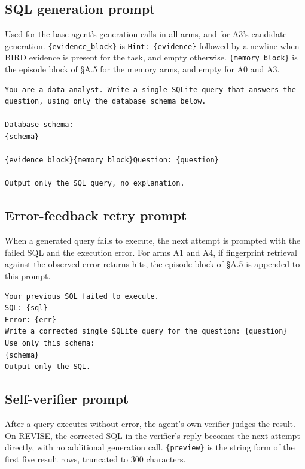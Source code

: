 \documentclass[sigconf, nonacm]{acmart}
\begin{document}
\subsection{SQL generation prompt}

Used for the base agent's generation calls in all arms, and for A3's candidate generation. \texttt{\{evidence\_block\}} is \texttt{Hint: \{evidence\}} followed by a newline when BIRD evidence is present for the task, and empty otherwise. \texttt{\{memory\_block\}} is the episode block of \S A.5 for the memory arms, and empty for A0 and A3.

\begin{Verbatim}[fontsize=\small, breaklines=true, breakanywhere=true]
You are a data analyst. Write a single SQLite query that answers the question, using only the database schema below.

Database schema:
{schema}

{evidence_block}{memory_block}Question: {question}

Output only the SQL query, no explanation.
\end{Verbatim}

\subsection{Error-feedback retry prompt}

When a generated query fails to execute, the next attempt is prompted with the failed SQL and the execution error. For arms A1 and A4, if fingerprint retrieval against the observed error returns hits, the episode block of \S A.5 is appended to this prompt.

\begin{Verbatim}[fontsize=\small, breaklines=true, breakanywhere=true]
Your previous SQL failed to execute.
SQL: {sql}
Error: {err}
Write a corrected single SQLite query for the question: {question}
Use only this schema:
{schema}
Output only the SQL.
\end{Verbatim}

\subsection{Self-verifier prompt}

After a query executes without error, the agent's own verifier judges the result. On REVISE, the corrected SQL in the verifier's reply becomes the next attempt directly, with no additional generation call. \texttt{\{preview\}} is the string form of the first five result rows, truncated to 300 characters.
\end{document}

